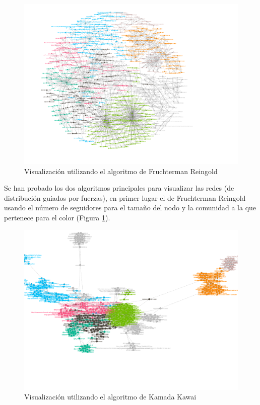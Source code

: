 \begin{figure}[H]
	\centering
	\includegraphics[width=14cm]{../images/fruchterman-reingold}
	\caption{Visualización utilizando el algoritmo de Fruchterman Reingold}
	\label{fig:fruchterman-reingold}
\end{figure}

Se han probado los dos algoritmos principales para visualizar las redes (de distribución guiados por fuerzas), en primer lugar el de Fruchterman Reingold usando el número de seguidores para el tamaño del nodo y la comunidad a la que pertenece para el color (Figura \ref{fig:fruchterman-reingold}).
	
\begin{figure}[H]
	\centering
	\includegraphics[width=14cm]{../images/kamada-kawai}
	\caption{Visualización utilizando el algoritmo de Kamada Kawai}
	\label{fig:kamada-kawai}
\end{figure}


